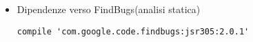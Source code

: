 \documentclass[../ManualeSviluppatore.tex]{subfiles}
\begin{document}
\begin{itemize}
\begin{itemize}
					\item Dipendenze verso FindBugs(analisi statica)
						\lstset{language=Java}
						\begin{lstlisting}
compile 'com.google.code.findbugs:jsr305:2.0.1'
						\end{lstlisting}

				\end{itemize}
		\end{itemize}
\end{document}
